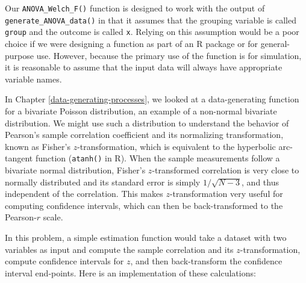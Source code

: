 \documentclass[
]{book}
\newenvironment{Shaded}{\begin{snugshade}}{\end{snugshade}}
\newcommand{\AttributeTok}[1]{\textcolor[rgb]{0.13,0.29,0.53}{#1}}
\newcommand{\ControlFlowTok}[1]{\textcolor[rgb]{0.13,0.29,0.53}{\textbf{#1}}}
\newcommand{\DecValTok}[1]{\textcolor[rgb]{0.00,0.00,0.81}{#1}}
\newcommand{\FunctionTok}[1]{\textcolor[rgb]{0.13,0.29,0.53}{\textbf{#1}}}
\newcommand{\NormalTok}[1]{#1}
\newcommand{\OtherTok}[1]{\textcolor[rgb]{0.56,0.35,0.01}{#1}}
\newcommand{\SpecialCharTok}[1]{\textcolor[rgb]{0.81,0.36,0.00}{\textbf{#1}}}
\begin{document}
Our \texttt{ANOVA\_Welch\_F()} function is designed to work with the output of \texttt{generate\_ANOVA\_data()} in that it assumes that the grouping variable is called \texttt{group} and the outcome is called \texttt{x}.
Relying on this assumption would be a poor choice if we were designing a function as part of an R package or for general-purpose use.
However, because the primary use of the function is for simulation, it is reasonable to assume that the input data will always have appropriate variable names.

In Chapter \ref{data-generating-processes}, we looked at a data-generating function for a bivariate Poisson distribution, an example of a non-normal bivariate distribution.
We might use such a distribution to understand the behavior of Pearson's sample correlation coefficient and its normalizing transformation, known as Fisher's \(z\)-transformation, which is equivalent to the hyperbolic arc-tangent function (\texttt{atanh()} in R).
When the sample measurements follow a bivariate normal distribution, Fisher's \(z\)-transformed correlation is very close to normally distributed and its standard error is simply \(1 / \sqrt{N - 3}\), and thus independent of the correlation.
This makes \(z\)-transformation very useful for computing confidence intervals, which can then be back-transformed to the Pearson-\(r\) scale.

In this problem, a simple estimation function would take a dataset with two variables as input and compute the sample correlation and its \(z\)-transformation, compute confidence intervals for \(z\), and then back-transform the confidence interval end-points.
Here is an implementation of these calculations:

\begin{Shaded}
\end{Shaded}
\end{document}
